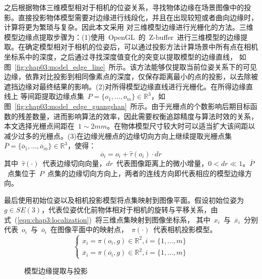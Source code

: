 之后根据物体三维模型相对于相机的位姿关系，寻找物体边缘在场景图像中的投影。直接投影物体模型需要对边缘进行线段化，并且在出现较短或者曲向边缘时，计算将更为繁琐与复杂。因此本文采用
对三维模型边缘进行光栅化的方法。三维模型边缘点提取步骤为：(1)使用~OpenGL~的~Z-buffer~进行三维模型的边缘提取。在确定模型相对于相机的位姿后，可以通过投影方法计算场景中所有点在相机坐标系中的深度，之后通过寻找深度值变化的突变以提取模型的边缘直线，
如图~\ref{fig:chap03:model_edge_line}~所示。该方法能够仅提取当前位姿关系下的可见边缘，依靠对比投影到相同像素点的深度，仅保存距离最小的点的投影，以去除被遮挡边缘对最终结果的影响。(2)对所得模型边缘直线进行光栅化。在所得边缘直线上
等间距提取边缘点集~$P=\{o_1,\dotsc ,o_m\}\in\mathbb{R}^3 $，如图~\ref{fig:chap03:model_edge_guangshan}~所示。由于光栅点的个数影响后期目标函数的残差数量，进而影响算法的效率，因此需要权衡追踪精度与算法时效的关系，
本文选择光栅点间距在~$1\sim 2mm$。在物体模型尺寸较大时可以适当扩大该间距以减少过多的光栅点。(3)在边缘光栅点的边缘切向方向上继续提取光栅点集~$\overline P=\{\overline o_1,\dotsc ,\overline o_m\}\in\mathbb{R}^3 $，使得：
\begin{equation}
  \label{equ:chap3:dir_point}
\overline o_i=o_i+\hat \tau (o_i)\cdot dr
\end{equation}
其中~$\hat \tau (\cdot)$~代表边缘切向向量，$dr$~代表图像距离上的微小增量，$0<dr\ll 1$。$\overline P$~点集位于~$P$~点集的边缘切向方向上，两者的连线方向即代表相应的模型边缘方向。

最后使用初始位姿以及相机投影模型将点集映射到图像平面。假设初始位姿为~$g\in SE(3)$，代表位姿优化前物体相对于相机的旋转与平移关系，由式~(\ref{equ:chap3:localization})~将三维点集映射到图像坐标系，
其中~$x_i$~与~$\overline x_i$~分别代表~$o_i$~与~$\overline o_i$~在图像平面中的映射点，~$\pi (\cdot)$~代表相机投影模型。
\begin{equation}
  \label{equ:chap3:localization}
  \left\{
    \begin{aligned}{}
      x_i=\pi(o_i,g)\in \mathbb{R}^2,i=\{1,\dotsc ,m\}\\
      \overline x_i=\pi(\overline o_i,g)\in \mathbb{R}^2,i=\{1,\dotsc ,m\}
    \end{aligned}
    \right.
\end{equation}

\begin{figure}[t] %
  \centering%
  \hspace{0.5em}%
  \hspace{0.5em}%
  \caption{模型边缘提取与投影}
  \label{fig:chap03:model_edge_extra_local}
\end{figure}

